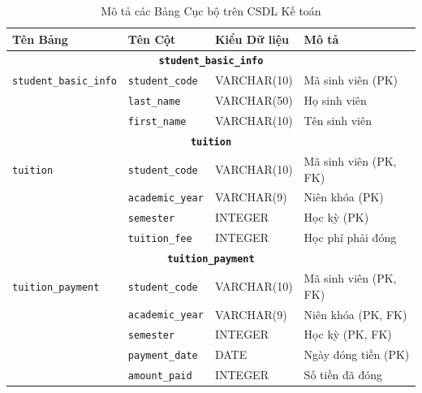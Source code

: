 \documentclass[conference]{IEEEtran}
\begin{document}
\begin{table}[htbp]
\caption{Mô tả các Bảng Cục bộ trên CSDL Kế toán}
\label{tab:local_tables}
\centering
\begin{tabular}{|l|l|l|p{5cm}|}
\hline
\textbf{Tên Bảng} & \textbf{Tên Cột} & \textbf{Kiểu Dữ liệu} & \textbf{Mô tả} \\
\hline
\multicolumn{4}{|c|}{\textbf{\texttt{student\_basic\_info}}} \\
\hline
\texttt{student\_basic\_info} & \texttt{student\_code} & VARCHAR(10) & Mã sinh viên (PK) \\
                             & \texttt{last\_name} & VARCHAR(50) & Họ sinh viên \\
                             & \texttt{first\_name} & VARCHAR(10) & Tên sinh viên \\
\hline
\multicolumn{4}{|c|}{\textbf{\texttt{tuition}}} \\
\hline
\texttt{tuition} & \texttt{student\_code} & VARCHAR(10) & Mã sinh viên (PK, FK) \\
                 & \texttt{academic\_year} & VARCHAR(9) & Niên khóa (PK) \\
                 & \texttt{semester} & INTEGER & Học kỳ (PK) \\
                 & \texttt{tuition\_fee} & INTEGER & Học phí phải đóng \\
\hline
\multicolumn{4}{|c|}{\textbf{\texttt{tuition\_payment}}} \\
\hline
\texttt{tuition\_payment} & \texttt{student\_code} & VARCHAR(10) & Mã sinh viên (PK, FK) \\
                          & \texttt{academic\_year} & VARCHAR(9) & Niên khóa (PK, FK) \\
                          & \texttt{semester} & INTEGER & Học kỳ (PK, FK) \\
                          & \texttt{payment\_date} & DATE & Ngày đóng tiền (PK) \\
                          & \texttt{amount\_paid} & INTEGER & Số tiền đã đóng \\
\hline
\end{tabular}
\end{table}
\end{document}
